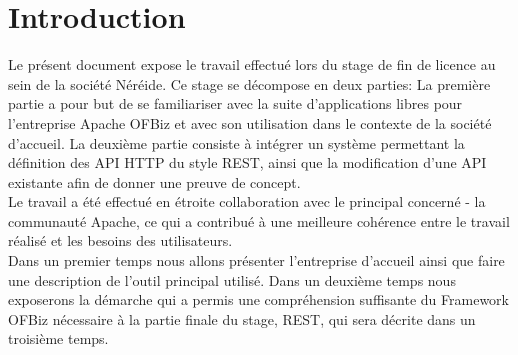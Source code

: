 \chapter{Introduction}

Le présent document expose le travail effectué lors du stage de fin de licence au sein de la société Néréide.
Ce stage se décompose en deux parties: 
La première partie a pour but de se familiariser avec la suite d'applications libres
pour l'entreprise
Apache OFBiz et avec son utilisation dans le contexte de la société d'accueil. 
La deuxième partie consiste à intégrer un système permettant la définition des API HTTP
du style REST,
 ainsi que la modification d'une API existante afin de donner une preuve de concept. \\
Le travail a été effectué en étroite collaboration avec le principal concerné - la 
communauté Apache,
ce qui a contribué à une meilleure cohérence entre le travail réalisé et les besoins des utilisateurs.\\
Dans un premier temps nous allons présenter l'entreprise d'accueil ainsi que faire une description de
l'outil principal utilisé.
Dans un deuxième temps nous exposerons la démarche qui a permis une compréhension suffisante du Framework OFBiz
 nécessaire à la partie finale du stage, REST, qui sera décrite dans un troisième temps. 

